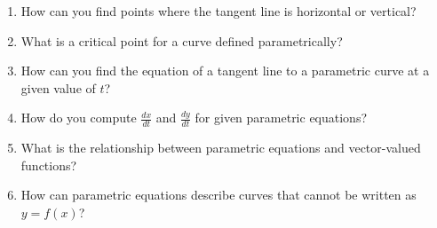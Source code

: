 \begin{enumerate}
  \item How can you find points where the tangent line is horizontal or vertical?
  \item What is a critical point for a curve defined parametrically?
  \item How can you find the equation of a tangent line to a parametric curve at a given value of $t$?
  \item How do you compute $\frac{dx}{dt}$ and $\frac{dy}{dt}$ for given parametric equations?
  \item What is the relationship between parametric equations and vector-valued functions?
  \item How can parametric equations describe curves that cannot be written as $y=f(x)$?
\end{enumerate}
